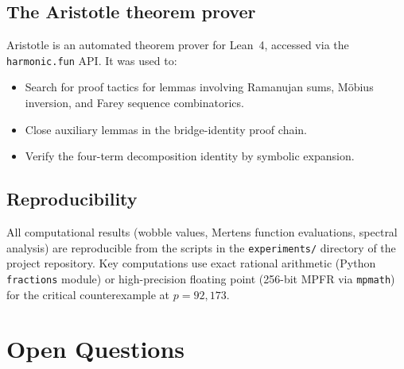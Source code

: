 \documentclass[11pt]{article}
\theoremstyle{definition}
\begin{document}
\subsection{The Aristotle theorem prover}\label{sec:aristotle}

Aristotle is an automated theorem prover for Lean~4, accessed via
the \texttt{harmonic.fun} API.  It was used to:
\begin{itemize}
  \item Search for proof tactics for lemmas involving Ramanujan sums,
    M\"obius inversion, and Farey sequence combinatorics.
  \item Close auxiliary lemmas in the bridge-identity proof chain.
  \item Verify the four-term decomposition identity by symbolic
    expansion.
\end{itemize}

\subsection{Reproducibility}\label{sec:reproducibility}

All computational results (wobble values, Mertens function
evaluations, spectral analysis) are reproducible from the scripts
in the \texttt{experiments/} directory of the project repository.
Key computations use exact rational arithmetic (Python
\texttt{fractions} module) or high-precision floating point
(256-bit MPFR via \texttt{mpmath}) for the critical counterexample
at $p = 92{,}173$.



\section{Open Questions}\label{sec:open}
\end{document}

